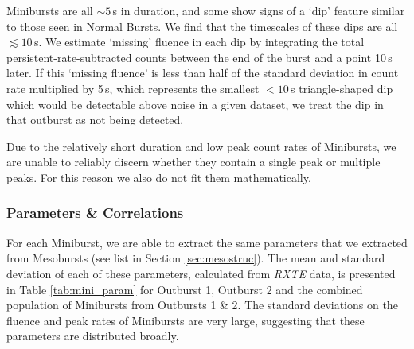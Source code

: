 \par Minibursts are all $\sim5$\,s in duration, and some show signs of a `dip' feature similar to those seen in Normal Bursts.  We find that the timescales of these dips are all $\lesssim10$\,s.  We estimate `missing' fluence in each dip by integrating the total persistent-rate-subtracted counts between the end of the burst and a point 10\,s later.  If this `missing fluence' is less than half of the standard deviation in count rate multiplied by 5\,s, which represents the smallest $<10$\,s triangle-shaped dip which would be detectable above noise in a given dataset, we treat the dip in that outburst as not being detected.
\par Due to the relatively short duration and low peak count rates of Minibursts, we are unable to reliably discern whether they contain a single peak or multiple peaks.  For this reason we also do not fit them mathematically.

\subsubsection{Parameters \& Correlations}

\par For each Miniburst, we are able to extract the same parameters that we extracted from Mesobursts (see list in Section \ref{sec:mesostruc}).  The mean and standard deviation of each of these parameters, calculated from \textit{RXTE} data, is presented in Table \ref{tab:mini_param} for Outburst 1, Outburst 2 and the combined population of Minibursts from Outbursts 1 \& 2.  The standard deviations on the fluence and peak rates of Minibursts are very large, suggesting that these parameters are distributed broadly.


